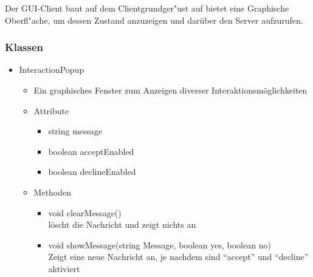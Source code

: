 \documentclass[a4paper,10pt]{article}
\begin{document}
Der GUI-Client baut auf dem Clientgrundger"ust auf bietet eine Graphische Oberfl"ache, um dessen Zustand anzuzeigen und darüber den Server aufzurufen.

\subsubsection{Klassen}

\begin{itemize}
\item InteractionPopup
\begin{itemize}
\item Ein graphisches Fenster zum Anzeigen diverser Interaktionsmöglichkeiten
\item Attribute
\begin{itemize}
\item string message
\item boolean acceptEnabled
\item boolean declineEnabled
\end{itemize}
\item Methoden
\begin{itemize}
\item void clearMessage() 
\\löscht die Nachricht und zeigt nichts an
\item void showMessage(string Message, boolean yes, boolean no)
\\Zeigt eine neue Nachricht an, je nachdem sind "`accept"' und "`decline"' aktiviert
\end{itemize}
\end{itemize}


\end{itemize}
\end{document}
